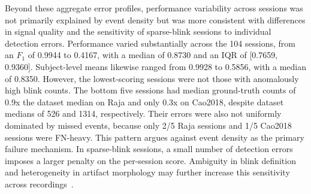 Beyond these aggregate error profiles, performance variability across sessions was not primarily explained by event density but was more consistent with differences in signal quality and the sensitivity of sparse-blink sessions to individual detection errors. Performance varied substantially across the 104 sessions, from an $F_1$ of 0.9944 to 0.4167, with a median of 0.8730 and an IQR of [0.7659, 0.9360]. Subject-level means likewise ranged from 0.9928 to 0.5856, with a median of 0.8350. However, the lowest-scoring sessions were not those with anomalously high blink counts. The bottom five sessions had median ground-truth counts of 0.9x the dataset median on Raja and only 0.3x on Cao2018, despite dataset medians of 526 and 1314, respectively. Their errors were also not uniformly dominated by missed events, because only 2/5 Raja sessions and 1/5 Cao2018 sessions were FN-heavy. This pattern argues against event density as the primary failure mechanism. In sparse-blink sessions, a small number of detection errors imposes a larger penalty on the per-session score. Ambiguity in blink definition and heterogeneity in artifact morphology may further increase this sensitivity across recordings~\citep{nystrm2024what,arpaia2025systematic}.
